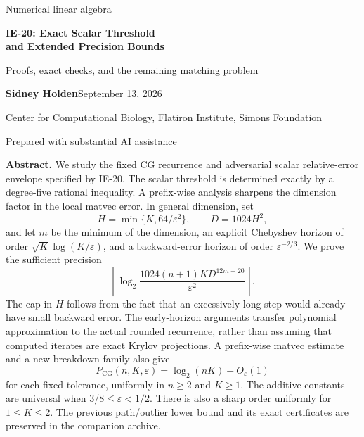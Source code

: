 \documentclass[11pt]{article}
\theoremstyle{remark}\newtheorem{remark}[theorem]{Remark}
\newcommand{\PCG}{P_{\mathrm{CG}}}
\newcommand{\eps}{\varepsilon}
\begin{document}
\hypersetup{pageanchor=false}
\begin{titlepage}
\vspace*{12mm}
{\large Numerical linear algebra\par}
\vspace{7mm}
{\LARGE\bfseries IE-20: Exact Scalar Threshold\\[3pt]and Extended Precision Bounds\par}
\vspace{7mm}
{\large Proofs, exact checks, and the remaining matching problem\par}
\vspace{10mm}
\textbf{Sidney Holden}\hfill September 13, 2026\par
{\small Center for Computational Biology, Flatiron Institute, Simons Foundation\par Prepared with substantial AI assistance\par}
\vspace{10mm}


\vspace{8mm}
\textbf{Abstract.}
We study the fixed CG recurrence and adversarial scalar relative-error
envelope specified by IE-20. The scalar threshold is determined exactly by
a degree-five rational inequality. A prefix-wise analysis sharpens the
dimension factor in the local matvec error. In general dimension, set
\[
H=\min\{K,64/\eps^2\},\qquad D=1024H^2,
\]
and let $m$ be the minimum of the dimension, an explicit Chebyshev horizon
of order $\sqrt K\log(K/\eps)$, and a backward-error horizon of order
$\eps^{-2/3}$. We prove the sufficient precision
\[
\left\lceil\log_2\frac{1024(n+1)K D^{12m+20}}{\eps^2}\right\rceil.
\]
The cap in $H$ follows from the fact that an excessively long step would
already have small backward error. The early-horizon arguments transfer
polynomial approximation to the actual rounded recurrence, rather than
assuming that computed iterates are exact Krylov projections.
A prefix-wise matvec estimate and a new breakdown family also give
\[
\PCG(n,K,\eps)=\log_2(nK)+O_{\eps}(1)
\]
for each fixed tolerance, uniformly in $n\ge2$ and $K\ge1$.
The additive constants are universal when $3/8\le\eps<1/2$.
There is also a sharp order uniformly for $1\le K\le2$. The previous path/outlier lower
bound and its exact certificates are preserved in the companion archive.


\end{titlepage}
\end{document}
